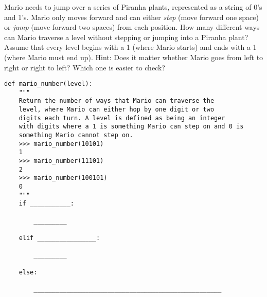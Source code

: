 \begin{blocksection}



\question Mario needs to jump over a series of Piranha plants, represented as a
string of 0's and 1's. Mario only moves forward and can
either \emph{step} (move forward one space) or \emph{jump} (move forward two
spaces) from each position. How many different ways can Mario traverse a level
without stepping or jumping into a Piranha plant? Assume that every level begins
with a 1 (where Mario starts) and ends with a 1 (where
Mario must end up).
\newline
Hint: Does it matter whether Mario goes from left to right or right to left? Which
one is easier to check?

\begin{lstlisting}
def mario_number(level):
    """
    Return the number of ways that Mario can traverse the
    level, where Mario can either hop by one digit or two
    digits each turn. A level is defined as being an integer
    with digits where a 1 is something Mario can step on and 0 is 
    something Mario cannot step on. 
    >>> mario_number(10101)
    1
    >>> mario_number(11101)
    2   
    >>> mario_number(100101)
    0
    """
    if ___________:
		
        _________
				
    elif ________________:
		
        _________
				
    else:
		
        ___________________________________________________
\end{lstlisting}
\end{blocksection}

